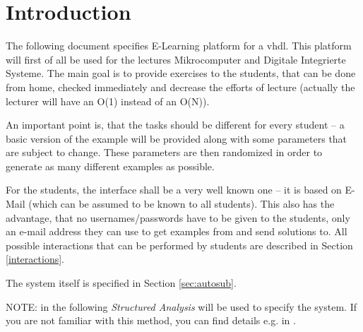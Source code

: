 \section{Introduction}

The following document specifies E-Learning platform for a \gls{vhdl}. This platform will first of all be used for the lectures Mikrocomputer and Digitale Integrierte Systeme. The main goal is to provide exercises to 
the students, that can be done from home, checked immediately and decrease the efforts of lecture (actually the lecturer will have an O(1) instead of an O(N)).

An important point is, that the tasks should be different for every student -- a basic version of the
example will be provided along with some parameters that are subject to change. These parameters are
then randomized in order to generate as many different examples as possible.

For the students, the interface shall be a very well known one -- it is based on E-Mail (which can be
assumed to be known to all students). This also has the advantage, that no usernames/passwords have to
be given to the students, only an e-mail address they can use to get examples from and send solutions to.
All possible interactions that can be performed by students are described in Section \ref{interactions}.

The system itself is specified in Section \ref{sec:autosub}.

NOTE: in the following {\it Structured Analysis} will be used to specify the
system. If you are not familiar with this method, you can find details e.g. in
\cite{demarco, gooma, cooling}.
